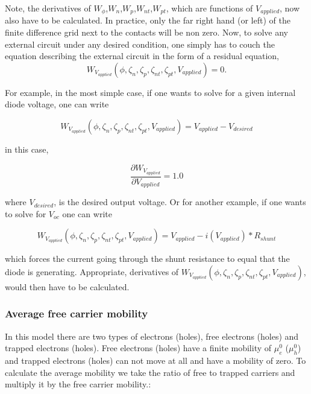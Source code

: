 \documentclass[11pt]{article}
\begin{document}
Note, the derivatives of $W_{\phi}$,$W_{n}$,$W_{p}$,$W_{nt}$,$W_{pt}$, which are functions of $V_{applied}$, now also have to be calculated.  In practice, only the far right hand (or left) of the finite difference grid next to the contacts will be non zero.  Now, to solve any external circuit under any desired condition, one simply has to couch the equation describing the external circuit in the form of a residual equation,
\begin{equation}
W_{V_{applied}}(\phi,\zeta_{n},\zeta_{p},\zeta_{nt},\zeta_{pt},V_{applied})=0 .
\end{equation}

For example, in the most simple case, if one wants to solve for a given internal diode voltage, one can write 

\begin{equation}
W_{V_{applied}}(\phi,\zeta_{n},\zeta_{p},\zeta_{nt},\zeta_{pt},V_{applied})=V_{applied}-V_{desired}
\end{equation}

in this case,

\begin{equation}
\frac{\partial W_{V_{applied}}}{\partial V_{applied}}=1.0
\end{equation}

where $V_{desired}$, is the desired output voltage. Or for another example, if one wants to solve for $V_{oc}$ one can write

\begin{equation}
W_{V_{applied}}(\phi,\zeta_{n},\zeta_{p},\zeta_{nt},\zeta_{pt},V_{applied})=V_{applied}-i(V_{applied})*R_{shunt}
\end{equation}

which forces the current going through the shunt resistance to equal that the diode is generating.  Appropriate, derivatives of $W_{V_{applied}}(\phi,\zeta_{n},\zeta_{p},\zeta_{nt},\zeta_{pt},V_{applied})$, would then have to be calculated.

\subsubsection{Average free carrier mobility}
In this model there are two types of electrons (holes), free electrons (holes) and trapped electrons (holes).  Free electrons (holes) have a finite mobility of $\mu_e^0$ ($\mu_h^0$) and trapped electrons (holes) can not move at all and have a mobility of zero.  To calculate the average mobility we take the ratio of free to trapped carriers and multiply it by the free carrier mobility.:
\end{document}
